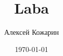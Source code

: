\documentclass[a4paper,12pt]{article}
\title{Laba}
\author{Алексей Кожарин}
\date{\today}
\begin{document}

\renewcommand{\baselinestretch}{1.3}







\end{document}
